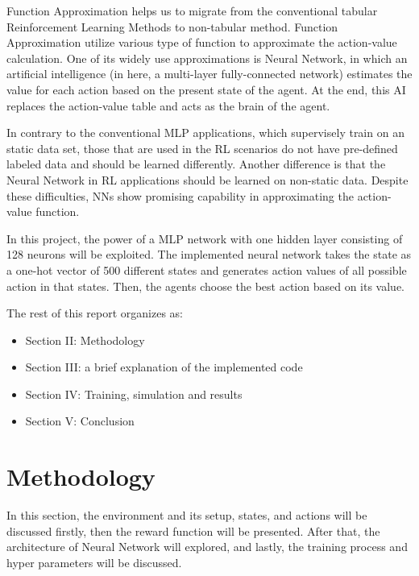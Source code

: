 \documentclass[lettersize,journal]{IEEEtran}
\begin{document}
Function Approximation helps us to migrate from the conventional tabular Reinforcement Learning Methods to non-tabular method. Function Approximation utilize various type of function to approximate the action-value calculation. One of its widely use approximations is Neural Network, in which an artificial intelligence (in here, a multi-layer fully-connected network) estimates the value for each action based on the present state of the agent. At the end, this AI replaces the action-value table and acts as the brain of the agent.\par

In contrary to the conventional MLP applications, which supervisely train on an static data set, those that are used in the RL scenarios do not have pre-defined labeled data and should be learned differently. Another difference is that the Neural Network in RL applications should be learned on non-static data. Despite these difficulties, NNs show promising capability in approximating the action-value function.\par

In this project, the power of a MLP network with one hidden layer consisting of 128 neurons will be exploited. The implemented neural network takes the state as a one-hot vector of 500 different states and generates action values of all possible action in that states. Then, the agents choose the best action based on its value.\par

The rest of this report organizes as:
\begin{itemize}
    \item Section II: Methodology
    \item Section III: a brief explanation of the implemented code
    \item Section IV: Training, simulation and results
    \item Section V: Conclusion
\end{itemize}
\vspace{0.3cm}


\section{Methodology}
In this section, the environment and its setup, states, and actions will be discussed firstly, then the reward function will be presented. After that, the architecture of Neural Network will explored, and lastly, the training process and hyper parameters will be discussed.
\end{document}
